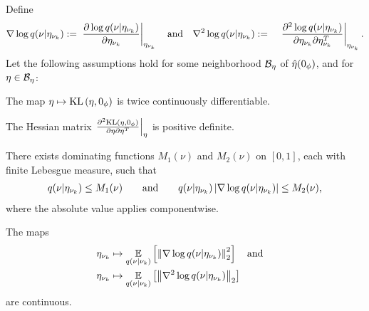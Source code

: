 \begin{thm}
%
Define
%
\begin{align*}
%
\nabla \log \q(\nu \vert \etanuk) :={}&
    \fracat{\partial \log \q(\nu \vert \etanuk)}{\partial \etanuk}{\etanuk}
    \mathtxt{and}
\nabla^2 \log \q(\nu \vert \etanuk) :={}&
    \fracat{\partial^2 \log \q(\nu \vert \etanuk)}
           {\partial \etanuk \partial \etanuk^T}{\etanuk}.
%
\end{align*}
%
Let the following assumptions hold for some neighborhood $\mathcal{B}_\eta$
of $\hat\eta(0_\phi)$, and for $\eta \in \mathcal{B}_\eta$:
%
\begin{assu}
    The map $\eta \mapsto \mathrm{KL}\left(\eta, 0_\phi\right)$ is twice
    continuously differentiable.
\end{assu}
%
\begin{assu}
    The Hessian matrix $\left.\frac{\partial^2 \mathrm{KL}\left(\eta, 0_\phi\right)}{\partial \eta \partial \eta^T}\right\vert_{\eta}$ is positive definite.
\end{assu}
%
\begin{assu}
%
There exists dominating functions $M_1(\nu)$ and $M_2(\nu)$ on $[0,1]$, each
with finite Lebesgue measure, such that
%
\begin{align*}
%
\q(\nu \vert \etanuk) \le M_1(\nu)
\mathand
\q(\nu \vert \etanuk) \abs{\nabla \log \q(\nu \vert \etanuk)} \le M_2(\nu),
%
\end{align*}
%
where the absolute value applies componentwise.
%
\end{assu}
%
\begin{assu}
%
The maps
%
\begin{align*}
%
\etanuk \mapsto{}& \expect{\q(\nu \vert \nuk)}{\norm{\nabla \log \q(\nu
\vert \etanuk)}_2^2} \mathtxt{and}\\
\etanuk \mapsto{}& \expect{\q(\nu \vert
\nuk)}{\norm{\nabla^2 \log \q(\nu \vert \etanuk)}_2}
%
\end{align*}
%
are continuous.
%
\end{assu}

\end{thm}

